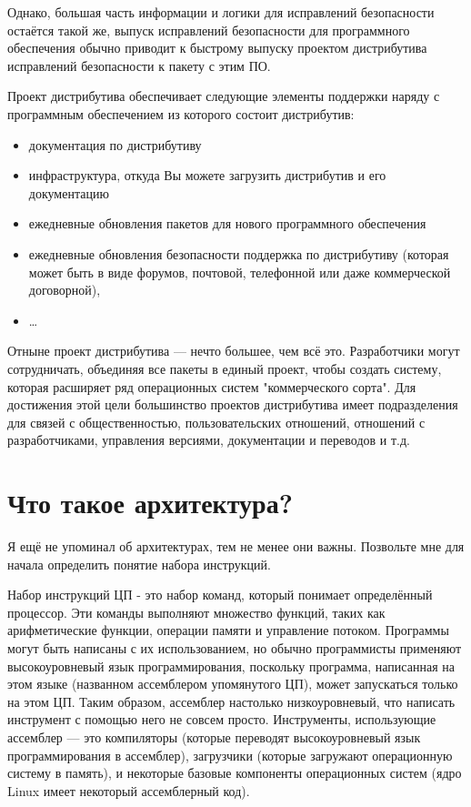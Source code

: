 \documentclass[10pt]{book}
\begin{document}
Однако, большая часть информации и логики для исправлений безопасности остаётся такой же, выпуск исправлений безопасности для программного обеспечения обычно приводит к быстрому выпуску проектом дистрибутива исправлений безопасности к пакету с этим ПО.

Проект дистрибутива обеспечивает следующие элементы поддержки наряду с программным обеспечением из которого состоит дистрибутив:

\begin{itemize}
	\item документация по дистрибутиву
	\item инфраструктура, откуда Вы можете загрузить дистрибутив и его документацию
	\item ежедневные обновления пакетов для нового программного обеспечения
	\item ежедневные обновления безопасности
поддержка по дистрибутиву (которая может быть в виде форумов, почтовой, телефонной или даже коммерческой договорной),
 \item \ldots
\end{itemize}

Отныне проект дистрибутива — нечто большее, чем всё это. Разработчики могут сотрудничать, объединяя все пакеты в единый проект, чтобы создать  систему, которая расширяет ряд операционных систем "коммерческого сорта". Для достижения этой цели большинство проектов дистрибутива имеет подразделения для связей с общественностью, пользовательских отношений, отношений с разработчиками, управления версиями, документации и переводов и т.д.

\section{Что такое архитектура?}

Я ещё не упоминал об архитектурах, тем не менее они важны. Позвольте мне для начала определить понятие набора инструкций.

Набор инструкций ЦП - это набор команд, который понимает определённый процессор. Эти команды выполняют множество функций, таких как арифметические функции, операции памяти и управление потоком. Программы могут быть написаны с их использованием, но обычно программисты применяют высокоуровневый язык программирования, поскольку  программа, написанная на этом языке (названном ассемблером упомянутого ЦП), может запускаться только на этом ЦП. Таким образом, ассемблер настолько низкоуровневый, что написать инструмент с помощью него не совсем просто. Инструменты, использующие ассемблер — это компиляторы (которые переводят высокоуровневый язык программирования в ассемблер), загрузчики (которые загружают операционную систему в память), и некоторые базовые компоненты операционных систем (ядро Linux имеет некоторый ассемблерный код).
\end{document}
